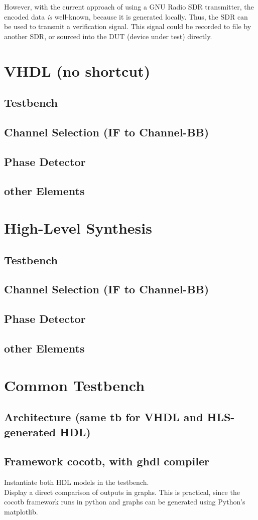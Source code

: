 However, with the current approach of using a GNU Radio SDR transmitter, the encoded data \textit{is} well-known, because it is generated locally.
Thus, the SDR can be used to transmit a verification signal.
This signal could be recorded to file by another SDR, or sourced into the DUT (device under test) directly.


\section{VHDL (no shortcut)}
  \subsection{Testbench}
  \subsection{Channel Selection (IF to Channel-BB)}
  \subsection{Phase Detector}
  \subsection{other Elements}

  \section{High-Level Synthesis}
  \subsection{Testbench}
  \subsection{Channel Selection (IF to Channel-BB)}
  \subsection{Phase Detector}
  \subsection{other Elements}

\section{Common Testbench}
  \subsection{Architecture (same tb for VHDL and HLS-generated HDL)}
  \subsection{Framework cocotb, with ghdl compiler}
  Instantiate both HDL models in the testbench.\\
  Display a direct comparison of outputs in graphs. This is practical, since the cocotb framework runs in python and graphs can be generated using Python's matplotlib.

